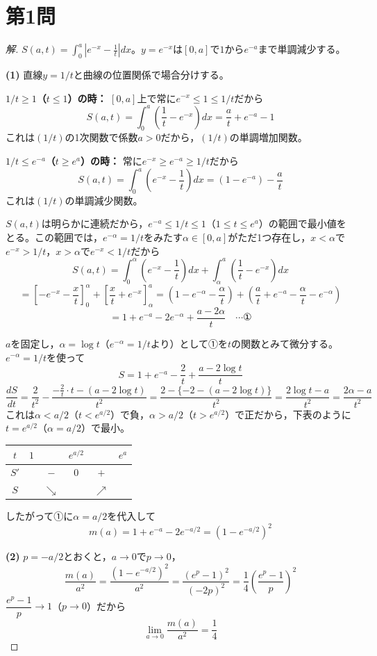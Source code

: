 \documentclass[../main.tex]{subfiles}
\begin{document}
\section*{第1問}

\begin{proof}[解]
  $S(a,t)=\displaystyle\int_0^a\left|e^{-x}-\frac1t\right|dx$。$y=e^{-x}$は$[0,a]$で$1$から$e^{-a}$まで単調減少する。

  \textbf{(1)} 直線$y=1/t$と曲線の位置関係で場合分けする。

  \textbf{$1/t\ge1$（$t\le1$）の時：} $[0,a]$上で常に$e^{-x}\le1\le1/t$だから
  \[
    S(a,t)=\int_0^a\left(\frac1t-e^{-x}\right)dx=\frac at+e^{-a}-1
  \]
  これは$(1/t)$の1次関数で係数$a>0$だから，$(1/t)$の単調増加関数。

  \textbf{$1/t\le e^{-a}$（$t\ge e^a$）の時：} 常に$e^{-x}\ge e^{-a}\ge1/t$だから
  \[
    S(a,t)=\int_0^a\left(e^{-x}-\frac1t\right)dx=(1-e^{-a})-\frac at
  \]
  これは$(1/t)$の単調減少関数。

  $S(a,t)$は明らかに連続だから，$e^{-a}\le1/t\le1$（$1\le t\le e^a$）の範囲で最小値をとる。この範囲では，$e^{-\alpha}=1/t$をみたす$\alpha\in[0,a]$がただ1つ存在し，$x<\alpha$で$e^{-x}>1/t$，$x>\alpha$で$e^{-x}<1/t$だから
  \[
    S(a,t)=\int_0^\alpha\left(e^{-x}-\frac1t\right)dx+\int_\alpha^a\left(\frac1t-e^{-x}\right)dx
  \]
  \[
    =\left[-e^{-x}-\frac xt\right]_0^\alpha+\left[\frac xt+e^{-x}\right]_\alpha^a
    =\left(1-e^{-\alpha}-\frac\alpha t\right)+\left(\frac at+e^{-a}-\frac\alpha t-e^{-\alpha}\right)
  \]
  \[
    =1+e^{-a}-2e^{-\alpha}+\frac{a-2\alpha}t \quad\cdots\text{①}
  \]

  $a$を固定し，$\alpha=\log t$（$e^{-\alpha}=1/t$より）として①を$t$の関数とみて微分する。$e^{-\alpha}=1/t$を使って
  \[
    S=1+e^{-a}-\frac2t+\frac{a-2\log t}t
  \]
  \[
    \frac{dS}{dt}=\frac2{t^2}-\frac{-\frac2t\cdot t-(a-2\log t)}{t^2}=\frac{2-\{-2-(a-2\log t)\}}{t^2}=\frac{2\log t-a}{t^2}=\frac{2\alpha-a}{t^2}
  \]
  これは$\alpha<a/2$（$t<e^{a/2}$）で負，$\alpha>a/2$（$t>e^{a/2}$）で正だから，下表のように$t=e^{a/2}$（$\alpha=a/2$）で最小。
  \begin{center}
    \begin{tabular}{c|ccccc}
      $t$ & $1$ & & $e^{a/2}$ & & $e^a$ \\
      \hline
      $S'$ & & $-$ & $0$ & $+$ & \\
      \hline
      $S$ & & $\searrow$ & & $\nearrow$ &
    \end{tabular}
  \end{center}
  したがって①に$\alpha=a/2$を代入して
  \[
    m(a)=1+e^{-a}-2e^{-a/2}=\left(1-e^{-a/2}\right)^2
  \]

  \textbf{(2)} $p=-a/2$とおくと，$a\to0$で$p\to0$，
  \[
    \frac{m(a)}{a^2}=\frac{\left(1-e^{-a/2}\right)^2}{a^2}=\frac{\left(e^{p}-1\right)^2}{(-2p)^2}=\frac14\left(\frac{e^p-1}p\right)^2
  \]
  $\dfrac{e^p-1}p\to1$（$p\to0$）だから
  \[
    \lim_{a\to0}\frac{m(a)}{a^2}=\frac14
  \]
\end{proof}
\end{document}

